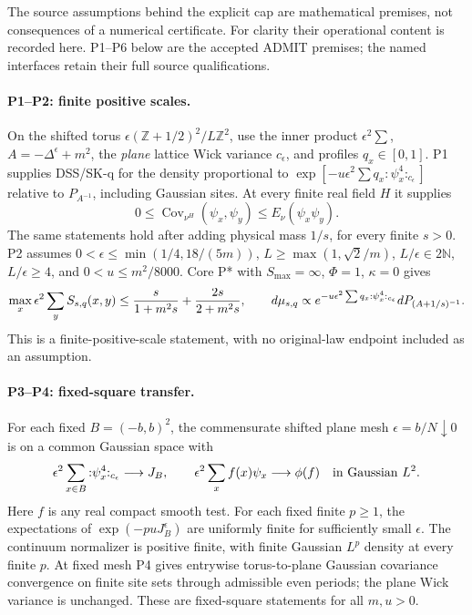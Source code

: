 \documentclass[11pt]{article}
\theoremstyle{plain}
\theoremstyle{definition}
\theoremstyle{remark}
\newcommand{\N}{\mathbb{N}}
\newcommand{\Z}{\mathbb{Z}}
\begin{document}
The source assumptions behind the explicit cap are mathematical premises,
not consequences of a numerical certificate. For clarity their operational
content is recorded here. P1--P6 below are the accepted ADMIT premises;
the named interfaces retain their full source qualifications.

\paragraph{P1--P2: finite positive scales.}
On the shifted torus $\epsilon(\Z+1/2)^2/L\Z^2$, use the inner product
$\epsilon^2\sum$, $A=-\Delta^\epsilon+m^2$, the \emph{plane} lattice Wick
variance $c_\epsilon$, and profiles $q_x\in[0,1]$. P1 supplies DSS/SK-q
for the density proportional to
$\exp[-u\epsilon^2\sum q_x{:}\psi_x^4{:}_{c_\epsilon}]$
relative to $P_{A^{-1}}$, including Gaussian sites. At every finite real
field $H$ it supplies
\begin{equation}\label{vqal:P1}
 0\le\operatorname{Cov}_{\nu^H}(\psi_x,\psi_y)
       \le E_\nu(\psi_x\psi_y).
\end{equation}
The same statements hold after adding physical mass $1/s$, for every
finite $s>0$. P2 assumes
$0<\epsilon\le\min(1/4,18/(5m))$,
$L\ge\max(1,\sqrt2/m)$, $L/\epsilon\in2\N$, $L/\epsilon\ge4$,
and $0<u\le m^2/8000$. Core P* with $S_{\max}=\infty$, $\Phi=1$,
$\kappa=0$ gives
\begin{equation}\label{vqal:P2}
 \max_x\epsilon^2\sum_y S_{s,q}(x,y)
 \le {s\over1+m^2s}+{2s\over2+m^2s},\qquad
 d\mu_{s,q}\propto e^{-u\epsilon^2\sum q_x{:}\psi_x^4{:}_{c_\epsilon}}
                  dP_{(A+1/s)^{-1}}.
\end{equation}
This is a finite-positive-scale statement, with no original-law endpoint
included as an assumption.

\paragraph{P3--P4: fixed-square transfer.}
For each fixed $B=(-b,b)^2$, the commensurate shifted plane mesh
$\epsilon=b/N\downarrow0$ is on a common Gaussian space with
\begin{equation}\label{vqal:P3}
 \epsilon^2\sum_{x\in B}{:}\psi_x^4{:}_{c_\epsilon}\longrightarrow J_B,
 \qquad \epsilon^2\sum_x f(x)\psi_x\longrightarrow\phi(f)
 \quad\hbox{in Gaussian }L^2.
\end{equation}
Here $f$ is any real compact smooth test. For each fixed finite $p\ge1$,
the expectations of $\exp(-puJ_B^\epsilon)$ are uniformly finite for
sufficiently small $\epsilon$. The continuum normalizer is positive finite,
with finite Gaussian $L^p$ density at every finite $p$. At fixed mesh P4
gives entrywise torus-to-plane Gaussian covariance convergence on finite
site sets through admissible even periods; the plane Wick variance is
unchanged. These are fixed-square statements for all $m,u>0$.
\end{document}
